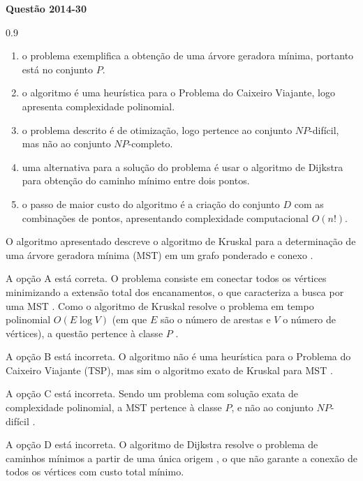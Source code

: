 \documentclass[12pt,a4paper]{article}
\newenvironment{question}[1]{%
    \pdfbookmark[3]{Questão #1}{q:#1}
    \label{q:#1}
    \bigskip\par\noindent
    \textbf{Questão #1} \dotfill
    \medskip\par\nopagebreak\noindent
    \ignorespaces
}{%
    \noindent\dotfill\medskip
}
\begin{document}
\begin{question}{2014-30}
\begin{spacing}{0.9}
\begin{small}
\begin{enumerate}[label=\Alph*)]
    \item o problema exemplifica a obtenção de uma árvore geradora mínima, portanto está no conjunto $P$.
    \item o algoritmo é uma heurística para o Problema do Caixeiro Viajante, logo apresenta complexidade polinomial.
    \item o problema descrito é de otimização, logo pertence ao conjunto $NP$-difícil, mas não ao conjunto $NP$-completo.
    \item uma alternativa para a solução do problema é usar o algoritmo de Dijkstra para obtenção do caminho mínimo entre dois pontos.
    \item o passo de maior custo do algoritmo é a criação do conjunto $D$ com as combinações de pontos,
    apresentando complexidade computacional $O(n!)$.
\end{enumerate}
\end{small}
\end{spacing}
\end{question}

O algoritmo apresentado descreve o algoritmo de Kruskal para a determinação
de uma árvore geradora mínima (MST) em um grafo ponderado e conexo \parencite[seç.~21.2]{clrs2022}.

A opção A está correta.
O problema consiste em conectar todos os vértices minimizando a extensão total dos encanamentos,
o que caracteriza a busca por uma MST \parencite[cap.~21]{clrs2022}.
Como o algoritmo de Kruskal resolve o problema em tempo polinomial $O(E \log V)$
(em que $E$ são o número de arestas e $V$ o número de vértices),
a questão pertence à classe $P$ \parencite[seç.~34.1]{clrs2022}.

A opção B está incorreta.
O algoritmo não é uma heurística para o Problema do Caixeiro Viajante (TSP),
mas sim o algoritmo exato de Kruskal para MST \parencite[seç.~21.2]{clrs2022}.

A opção C está incorreta.
Sendo um problema com solução exata de complexidade polinomial,
a MST pertence à classe $P$, e não ao conjunto $NP$-difícil \parencite[seç.~34.1]{clrs2022}.

A opção D está incorreta.
O algoritmo de Dijkstra resolve o problema de caminhos mínimos a partir de uma única origem \parencite[seç.~22.3]{clrs2022},
o que não garante a conexão de todos os vértices com custo total mínimo.
\end{document}
